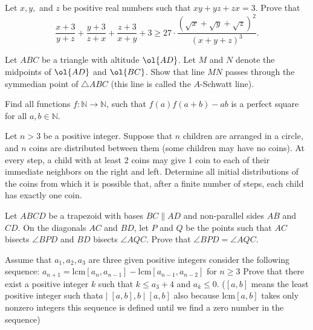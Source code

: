 \documentclass[11pt]{scrartcl}
\begin{document}
\begin{problem}
Let $x, y,$ and $z$ be positive real numbers such that $xy + yz + zx = 3$. Prove that
$$\frac{x + 3}{y + z} + \frac{y + 3}{z + x} + \frac{z + 3}{x + y} + 3 \ge 27 \cdot \frac{(\sqrt{x} + \sqrt{y} + \sqrt{z})^2}{(x + y + z)^3}.$$
\end{problem}
\begin{problem}
  Let $ABC$ be a triangle with altitude $\ol{AD}$.
  Let $M$ and $N$ denote the midpoints of $\ol{AD}$ and $\ol{BC}$.
  Show that line $MN$ passes through
  the symmedian point of $\triangle ABC$
  (this line is called the $A$-Schwatt line).
\end{problem}
\begin{problem}
	Find all functions $f:\mathbb{N} \rightarrow \mathbb{N}$, such that $f(a)f(a+b)-ab$ is a perfect square for all $a, b \in \mathbb{N}$.
\end{problem}
\begin{problem}[IMO SL 2022/C4]
Let $n > 3$ be a positive integer. Suppose that $n$ children are arranged in a circle, and $n$ coins are distributed between them (some children may have no coins). At every step, a child with at least 2 coins may give 1 coin to each of their immediate neighbors on the right and left. Determine all initial distributions of the coins from which it is possible that, after a finite number of steps, each child has exactly one coin.  
\end{problem}
\begin{problem}
Let $ABCD$ be a trapezoid with bases $BC \parallel AD$ and non-parallel sides $AB$ and $CD$. On the diagonals $AC$ and $BD$, let $P$ and $Q$ be the points such that $AC$ bisects $\angle BPD$ and $BD$ bisects $\angle AQC$. Prove that $\angle BPD = \angle AQC$.
\end{problem}
\begin{problem}
Assume that $a_1, a_2, a_3$ are three given positive integers consider the following sequence:
$a_{n+1}=\text{lcm}[a_n, a_{n-1}]-\text{lcm}[a_{n-1}, a_{n-2}]$ for $n\ge 3$
Prove that there exist a positive integer $k$ such that $k\le a_3+4$ and $a_k\le 0$.
($[a, b]$ means the least positive integer such that$ a\mid[a,b], b\mid[a, b]$ also because $\text{lcm}[a, b]$ takes only nonzero integers this sequence is defined until we find a zero number in the sequence)
\end{problem}
\end{document}
